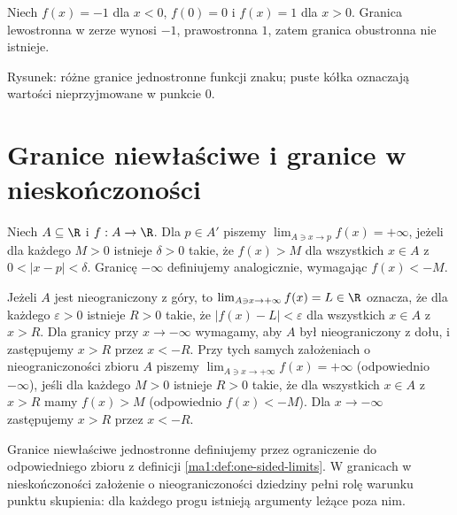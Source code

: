 \begin{przyklad}
\label{ma1:ex:sign-one-sided}
Niech $f(x)=-1$ dla $x<0$, $f(0)=0$ i $f(x)=1$ dla $x>0$. Granica lewostronna w zerze wynosi $-1$, prawostronna $1$, zatem granica obustronna nie istnieje.
\end{przyklad}
\begin{center}

\small Rysunek: różne granice jednostronne funkcji znaku; puste kółka oznaczają wartości nieprzyjmowane w punkcie $0$.
\end{center}

\section{Granice niewłaściwe i granice w nieskończoności}
\begin{definicja}
\label{ma1:def:extended-function-limits}
Niech $A\subseteq\R$ i $f:A\to\R$. Dla $p\in A'$ piszemy $\lim_{A\ni x\to p}f(x)=+\infty$, jeżeli dla każdego $M>0$ istnieje $\delta>0$ takie, że $f(x)>M$ dla wszystkich $x\in A$ z $0<|x-p|<\delta$. Granicę $-\infty$ definiujemy analogicznie, wymagając $f(x)<-M$.

Jeżeli $A$ jest nieograniczony z góry, to $\lim_{A\ni x\to+\infty}f(x)=L\in\R$ oznacza, że dla każdego $\varepsilon>0$ istnieje $R>0$ takie, że $|f(x)-L|<\varepsilon$ dla wszystkich $x\in A$ z $x>R$. Dla granicy przy $x\to-\infty$ wymagamy, aby $A$ był nieograniczony z dołu, i zastępujemy $x>R$ przez $x<-R$. Przy tych samych założeniach o nieograniczoności zbioru $A$ piszemy $\lim_{A\ni x\to+\infty}f(x)=+\infty$ (odpowiednio $-\infty$), jeśli dla każdego $M>0$ istnieje $R>0$ takie, że dla wszystkich $x\in A$ z $x>R$ mamy $f(x)>M$ (odpowiednio $f(x)<-M$). Dla $x\to-\infty$ zastępujemy $x>R$ przez $x<-R$.
\end{definicja}
Granice niewłaściwe jednostronne definiujemy przez ograniczenie do odpowiedniego zbioru z definicji \ref{ma1:def:one-sided-limits}. W granicach w nieskończoności założenie o nieograniczoności dziedziny pełni rolę warunku punktu skupienia: dla każdego progu istnieją argumenty leżące poza nim.


